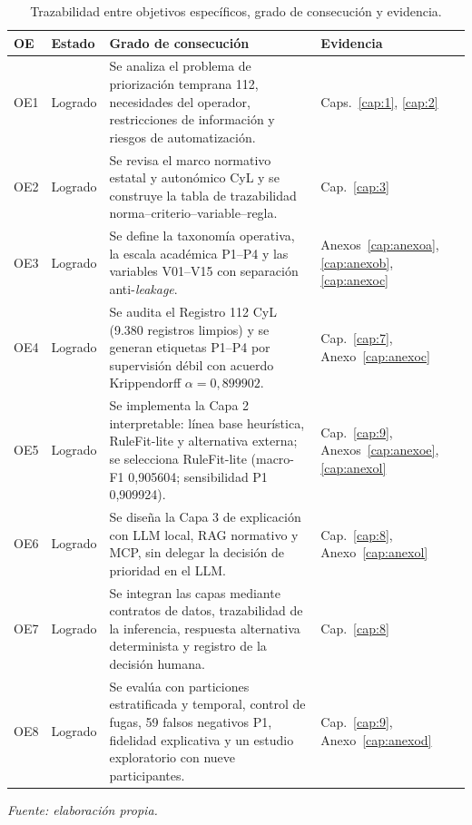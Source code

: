 \begin{table}[htbp]
\centering
\scriptsize
\setlength{\tabcolsep}{4pt}
\begin{tabular}{|p{1.0cm}|p{1.4cm}|p{6.6cm}|p{3.4cm}|}
\hline
\textbf{OE} & \textbf{Estado} & \textbf{Grado de consecución} & \textbf{Evidencia} \\ \hline
OE1 & Logrado & Se analiza el problema de priorización temprana 112, necesidades del operador, restricciones de información y riesgos de automatización. & Caps.~\ref{cap:1}, \ref{cap:2} \\ \hline
OE2 & Logrado & Se revisa el marco normativo estatal y autonómico CyL y se construye la tabla de trazabilidad norma--criterio--variable--regla. & Cap.~\ref{cap:3} \\ \hline
OE3 & Logrado & Se define la taxonomía operativa, la escala académica P1--P4 y las variables V01--V15 con separación anti-\textit{leakage}. & Anexos~\ref{cap:anexoa}, \ref{cap:anexob}, \ref{cap:anexoc} \\ \hline
OE4 & Logrado & Se audita el Registro 112 CyL (9.380 registros limpios) y se generan etiquetas P1--P4 por supervisión débil con acuerdo Krippendorff \(\alpha = 0{,}899902\). & Cap.~\ref{cap:7}, Anexo~\ref{cap:anexoc} \\ \hline
OE5 & Logrado & Se implementa la Capa 2 interpretable: línea base heurística, RuleFit-lite y alternativa externa; se selecciona RuleFit-lite (macro-F1 0,905604; sensibilidad P1 0,909924). & Cap.~\ref{cap:9}, Anexos~\ref{cap:anexoe}, \ref{cap:anexol} \\ \hline
OE6 & Logrado & Se diseña la Capa 3 de explicación con LLM local, RAG normativo y MCP, sin delegar la decisión de prioridad en el LLM. & Cap.~\ref{cap:8}, Anexo~\ref{cap:anexol} \\ \hline
OE7 & Logrado & Se integran las capas mediante contratos de datos, trazabilidad de la inferencia, respuesta alternativa determinista y registro de la decisión humana. & Cap.~\ref{cap:8} \\ \hline
OE8 & Logrado & Se evalúa con particiones estratificada y temporal, control de fugas, 59 falsos negativos P1, fidelidad explicativa y un estudio exploratorio con nueve participantes. & Cap.~\ref{cap:9}, Anexo~\ref{cap:anexod} \\ \hline
\end{tabular}
\caption{Trazabilidad entre objetivos específicos, grado de consecución y evidencia.}
\label{tab:trazabilidad-oe}
\smallskip
{\small\textit{Fuente: elaboración propia.}\par}
\end{table}

